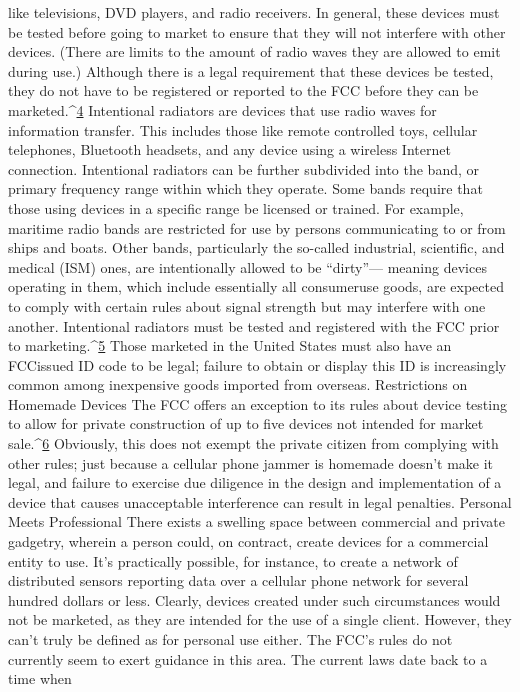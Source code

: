 like televisions, DVD players, and radio receivers. In general, these devices
must be tested before going to market to ensure that they will not interfere
with other devices. (There are limits to the amount of radio waves they
are allowed to emit during use.) Although there is a legal requirement that
these devices be tested, they do not have to be registered or reported to the
FCC before they can be marketed.^{\href{#endnotes-hord}{4}}
Intentional radiators are devices that use radio waves for information transfer.
This includes those like remote controlled toys, cellular telephones,
Bluetooth headsets, and any device using a wireless Internet connection.
Intentional radiators can be further subdivided into the band, or primary
frequency range within which they operate. Some bands require that those
using devices in a specific range be licensed or trained. For example, maritime
radio bands are restricted for use by persons communicating to or
from ships and boats. Other bands, particularly the so-called industrial,
scientific, and medical (ISM) ones, are intentionally allowed to be ``dirty''—
meaning devices operating in them, which include essentially all consumeruse
goods, are expected to comply with certain rules about signal strength
but may interfere with one another.
Intentional radiators must be tested and registered with the FCC prior to
marketing.^{\href{#endnotes-hord}{5}} Those marketed in the United States must also have an FCCissued
ID code to be legal; failure to obtain or display this ID is increasingly
common among inexpensive goods imported from overseas.
Restrictions on Homemade Devices
The FCC offers an exception to its rules about device testing to allow for private
construction of up to five devices not intended for market sale.^{\href{#endnotes-hord}{6}} Obviously,
this does not exempt the private citizen from complying with other
rules; just because a cellular phone jammer is homemade doesn't make it
legal, and failure to exercise due diligence in the design and implementation
of a device that causes unacceptable interference can result in legal penalties.
Personal Meets Professional
There exists a swelling space between commercial and private gadgetry,
wherein a person could, on contract, create devices for a commercial entity
to use. It's practically possible, for instance, to create a network of distributed
sensors reporting data over a cellular phone network for several hundred
dollars or less.
Clearly, devices created under such circumstances would not be marketed,
as they are intended for the use of a single client. However, they can't truly
be defined as for personal use either. The FCC's rules do not currently seem
to exert guidance in this area. The current laws date back to a time when

